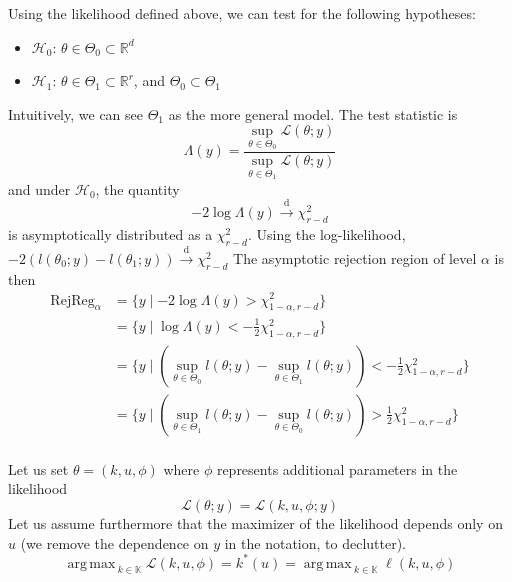 \documentclass[a4paper,11pt]{article}
\newcommand{\Kspace}{\mathbb{K}}
\DeclareMathOperator*{\argmax}{arg\,max \,}
\theoremstyle{defi}
\numberwithin{thmCounter}{section}
\begin{document}
\label{sec:lik_test}
Using the likelihood defined above, we can test for the following hypotheses:
\begin{itemize}
\item $\mathcal{H}_0$: $\theta \in \Theta_0\subset \mathbb{R}^d$
\item $\mathcal{H}_1$: $\theta \in \Theta_1 \subset \mathbb{R}^r$, and $\Theta_0 \subset \Theta_1$
\end{itemize}
Intuitively, we can see $\Theta_1$ as the more general model.
The test statistic is
\begin{equation}
  \label{eq:def_lik_ratio}
  \Lambda(y) = \frac{\sup_{\theta \in \Theta_0} \mathcal{L}(\theta ; y)}{\sup_{\theta \in \Theta_1} \mathcal{L}(\theta ; y)}
\end{equation}
and under $\mathcal{H}_0$, the quantity 
\begin{equation}
  - 2 \log \Lambda(y) \xrightarrow[]{\mathrm{d}} \chi^2_{r-d}
\end{equation}
is asymptotically distributed as a $\chi^2_{r-d}$.
Using the log-likelihood, $-2(l(\theta_0;y) - l(\theta_1;y)) \xrightarrow{\mathrm{d}} \chi^2_{r-d}$
The asymptotic rejection region of level $\alpha$ is then
\begin{align}
  \mathrm{RejReg}_{\alpha} &= \{y \mid -2 \log \Lambda(y) > \chi^2_{1-\alpha, r-d} \} \\
                           &= \{y \mid \log \Lambda(y) < -\frac12 \chi^2_{1-\alpha, r-d} \} \\
                           &= \{ y \mid (\sup_{\theta\in\Theta_0} l(\theta;y) - \sup_{\theta\in\Theta_1} l(\theta;y)) < -\frac12 \chi^2_{1-\alpha, r-d} \} \\
                           &= \{ y \mid (\sup_{\theta\in\Theta_1} l(\theta;y) - \sup_{\theta\in\Theta_0} l(\theta;y)) > \frac12 \chi^2_{1-\alpha, r-d} \} \\
\end{align}




Let us set $\theta = (k,u,\phi)$ where $\phi$ represents additional parameters in the likelihood
\begin{equation}
  \mathcal{L}(\theta; y) = \mathcal{L}(k, u, \phi ; y)
\end{equation}
Let us assume furthermore that the maximizer of the likelihood depends only on $u$ (we remove the dependence on $y$ in the notation, to declutter).
\begin{equation}
  \argmax_{k \in \Kspace} \mathcal{L}(k,u, \phi) = k^*(u) = \argmax_{k \in \Kspace} \ell(k,u, \phi)
\end{equation}
\end{document}
